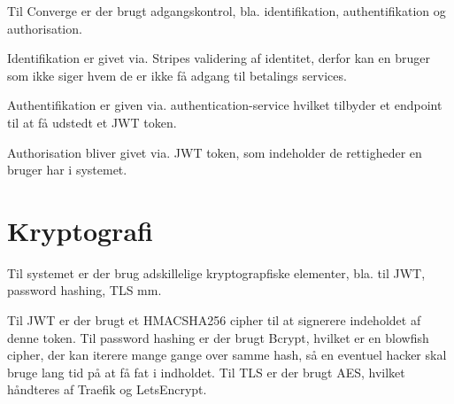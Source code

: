 Til Converge er der brugt adgangskontrol, bla. identifikation, authentifikation og authorisation.

Identifikation er givet via. Stripes validering af identitet, derfor kan en bruger som ikke siger hvem de er ikke få adgang til betalings services.

Authentifikation er given via. authentication-service hvilket tilbyder et endpoint til at få udstedt et JWT token.

Authorisation bliver givet via. JWT token, som indeholder de rettigheder en bruger har i systemet.

\section{Kryptografi}

Til systemet er der brug adskillelige kryptograpfiske elementer, bla. til JWT, password hashing, TLS mm.

Til JWT er der brugt et HMACSHA256 cipher til at signerere indeholdet af denne token. Til password hashing er der brugt Bcrypt, hvilket er en blowfish cipher, der kan iterere mange gange over samme hash, så en eventuel hacker skal bruge lang tid på at få fat i indholdet. Til TLS er der brugt AES, hvilket håndteres af Traefik og LetsEncrypt.